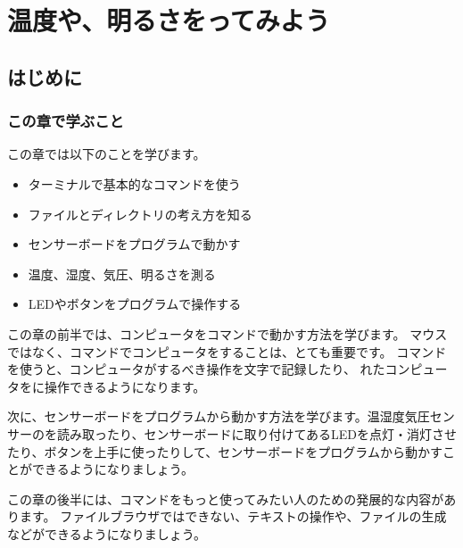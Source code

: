 \documentclass[text03.tex]{subfiles}
\begin{document}
\chapter{温度や、明るさをってみよう}
\section{はじめに}
\subsection{この章で学ぶこと}
この章では以下のことを学びます。







\begin{itemize}
    \item ターミナルで基本的なコマンドを使う
    \item ファイルとディレクトリの考え方を知る
    \item センサーボードをプログラムで動かす
    \item 温度、湿度、気圧、明るさを測る
    \item LEDやボタンをプログラムで操作する
\end{itemize}

この章の前半では、コンピュータをコマンドで動かす方法を学びます。
マウスではなく、コマンドでコンピュータをすることは、とても重要です。
コマンドを使うと、コンピュータがするべき操作を文字で記録したり、
れたコンピュータをに操作できるようになります。

次に、センサーボードをプログラムから動かす方法を学びます。温湿度気圧センサーのを読み取ったり、センサーボードに取り付けてあるLEDを点灯・消灯させたり、ボタンを上手に使ったりして、センサーボードをプログラムから動かすことができるようになりましょう。

この章の後半には、コマンドをもっと使ってみたい人のための発展的な内容があります。
ファイルブラウザではできない、テキストの操作や、ファイルの生成などができるようになりましょう。
\end{document}
